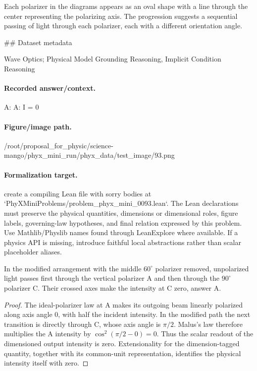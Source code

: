 Each polarizer in the diagrams appears as an oval shape with a line through the center representing the polarizing axis. The progression suggests a sequential passing of light through each polarizer, each with a different orientation angle.

\#\# Dataset metadata

Wave Optics; Physical Model Grounding Reasoning, Implicit Condition Reasoning

\paragraph{Recorded answer/context.}
A: A: I = 0

\paragraph{Figure/image path.}
/root/proposal\_for\_physic/science-mango/phyx\_mini\_run/phyx\_data/test\_image/93.png

\paragraph{Formalization target.}
create a compiling Lean file with sorry bodies at `PhyXMiniProblems/problem\_phyx\_mini\_0093.lean`. The Lean declarations must preserve the physical quantities, dimensions or dimensional roles, figure labels, governing-law hypotheses, and final relation expressed by this problem.
Use Mathlib/Physlib names found through LeanExplore where available. If a physics API is missing, introduce faithful local abstractions rather than scalar placeholder aliases.

\begin{theorem}
\label{thm:physics:phyx_mini_0093:target}
In the modified arrangement with the middle \(60^\circ\) polarizer removed,
unpolarized light passes first through the vertical polarizer A and then
through the \(90^\circ\) polarizer C.  Their crossed axes make the intensity
at C zero, answer A.
\end{theorem}
\begin{proof}
The ideal-polarizer law at A makes its outgoing beam linearly polarized along
axis angle \(0\), with half the incident intensity.  In the modified path the
next transition is directly through C, whose axis angle is \(\pi/2\).
Malus's law therefore multiplies the A intensity by
\(\cos^2(\pi/2-0)=0\).  Thus the scalar readout of the dimensioned output
intensity is zero.  Extensionality for the dimension-tagged quantity, together
with its common-unit representation, identifies the physical intensity itself
with zero.
\end{proof}

